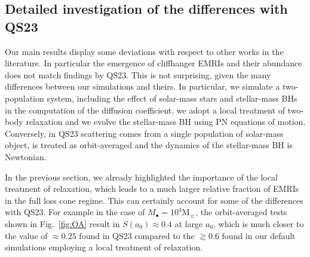 \documentclass[desactivate]{aa}
\begin{document}
    \subsection{Detailed investigation of the differences with QS23}   \label{sec:tests}      
        Our main results display some deviations with respect to other works in the literature. In particular the emergence of cliffhanger EMRIs and their abundance does not match findings by QS23. This is not surprising, given the many differences between our simulations and theirs. In particular, we simulate a two-population system, including the effect of solar-mass stars and stellar-mass BHs in the computation of the diffusion coefficient, we adopt a local treatment of two-body relaxation and we evolve the stellar-mass BH using PN equations of motion. Conversely, in QS23 scattering comes from a single population of solar-mass object, is treated as orbit-averaged and the dynamics of the stellar-mass BH is Newtonian. 
        
        In the previous section, we already highlighted the importance of the local treatment of relaxation, which leads to a much larger relative fraction of EMRIs in the full loss cone regime. This can certainly account for some of the differences with QS23. For example in the case of  $M_\bullet = 10^4 \mathrm{M}_\sun$, the orbit-averaged tests shown in Fig.~\ref{fig:OA} result in $S(a_0)\approx 0.4$ at large $a_0$, which is much closer to the value of $\approx 0.25$ found in QS23 compared to the $\gtrsim 0.6$ found in our default simulations employing a local treatment of relaxation.
        
\end{document}
